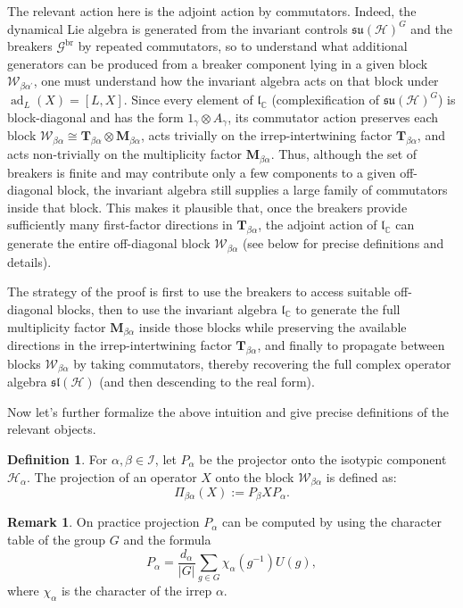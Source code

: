 \documentclass[10pt,twocolumn,superscriptaddress,aps,amsmath,amssymb,citeautoscript,floatfix,prx]{revtex4-2}
\newcounter{alg}
\theoremstyle{plain}
\theoremstyle{plain}
\theoremstyle{plain}
\theoremstyle{plain}
\theoremstyle{plain}
\theoremstyle{plain}
\newcommand{\C}{\mathbb{C}}
\newcommand{\HH}{\mathcal{H}}
\theoremstyle{plain}
\theoremstyle{definition}
\newtheorem{smdefinition}[smtheorem]{Definition}
\newtheorem{smremark}[smtheorem]{Remark}
\theoremstyle{plain}
\begin{document}
\begin{appendix}
The relevant action here is the adjoint action by commutators. 
Indeed, the dynamical Lie algebra is generated from the invariant controls $\mathfrak{su}(\HH)^G$ and the breakers
$\mathcal{G}^{\text{br}}$ by repeated commutators, so to understand what additional generators can be produced 
from a breaker component lying in a given block $\mathcal{W}_{\beta \alpha^{\prime}}$, one must understand how the invariant algebra 
acts on that block under $\operatorname{ad}_L(X)=[L, X]$. Since every element of $\mathfrak{l}_{\C}$ (complexification of $\mathfrak{su}(\HH)^G$) is block-diagonal and has the form $\mathrm{1}_{\gamma} \otimes A_\gamma$, 
its commutator action preserves each block $\mathcal{W}_{\beta \alpha} \cong \mathbf{T}_{\beta \alpha} \otimes \mathbf{M}_{\beta \alpha}$, 
acts trivially on the irrep-intertwining factor $\mathbf{T}_{\beta \alpha}$, and acts non-trivially on the multiplicity factor $\mathbf{M}_{\beta \alpha}$. Thus, although the set of breakers is finite and may contribute only a few components to a given off-diagonal block, 
the invariant algebra still supplies a large family of commutators inside that block. This makes it plausible that, once the breakers provide sufficiently many first-factor directions in $\mathbf{T}_{\beta \alpha}$, the adjoint action of $\mathfrak{l}_{\C}$ 
can generate the entire off-diagonal block $\mathcal{W}_{\beta \alpha}$ (see below for precise definitions and details).

The strategy of the proof is first to use the breakers to access suitable off-diagonal blocks, then to use the invariant algebra $\mathfrak{l}_\C$ to generate the full multiplicity factor $\mathbf{M}_{\beta \alpha}$ 
inside those blocks while preserving the available directions in the irrep-intertwining factor $\mathbf{T}_{\beta \alpha}$, and finally to propagate between blocks $\mathcal{W}_{\beta \alpha}$ by taking commutators, 
thereby recovering the full complex operator algebra $\mathfrak{sl}(\HH)$ (and then descending to the real form).

Now let's further formalize the above intuition and give precise definitions of the relevant objects.
\begin{smdefinition}\label{def:projection_onto_block}
    For $\alpha, \beta \in \mathcal{I}$, let $P_\alpha$ be the projector onto the isotypic component $\HH_\alpha$. The projection of an operator $X$ onto the block $\mathcal{W}_{\beta\alpha}$ is defined as:
    \begin{equation*}
        \Pi_{\beta\alpha}(X) := P_\beta X P_\alpha.
    \end{equation*}
\end{smdefinition}
\begin{smremark}
    On practice projection $P_{\alpha}$ can be computed by using the character table of the group $G$ and the formula
    \begin{equation*}\label{eq:projector_formula}
        P_\alpha=\frac{d_\alpha}{|G|} \sum_{g \in G} \chi_\alpha\left(g^{-1}\right) U(g),
    \end{equation*}
    where $\chi_\alpha$ is the character of the irrep $\alpha$. 
\end{smremark}


\end{appendix}
\end{document}
